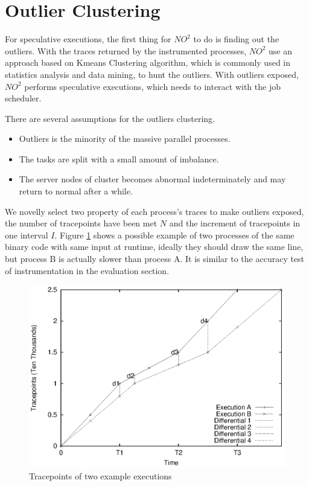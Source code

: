 \section{Outlier Clustering}

For speculative executions, the first thing for $NO^2$ to do is finding out the outliers.
With the traces returned by the instrumented processes, $NO^2$ use an approach based on
Kmeans Clustering algorithm, which is commonly used in statistics analysis and data
mining, to hunt the outliers. With outliers exposed, $NO^2$ performs speculative
executions, which needs to interact with the job scheduler.

There are several assumptions for the outliers clustering.

\begin{itemize}
\item Outliers is the minority of the massive parallel processes.
\item The tasks are split with a small amount of imbalance.
\item The server nodes of cluster becomes abnormal indeterminately and may return to
normal after a while.
\end{itemize}

We novelly select two property of each process's traces to make outliers exposed, the
number of tracepoints have been met $N$ and the increment of tracepoints in one interval
$I$. Figure \ref{figure:executionsexample} shows a possible example of two processes of
the same binary code with same input at runtime, ideally they should draw the same line,
but process B is actually slower than process A. It is similar to the accuracy test of
instrumentation in the evaluation section.

\begin{figure}
\centering
\includegraphics[width=0.9\columnwidth]{figures/executions_example.eps}
\caption{Tracepoints of two example executions}
\label{figure:executionsexample}
\end{figure}

